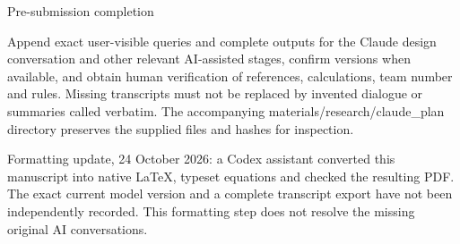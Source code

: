 Pre-submission completion


Append exact user-visible queries and complete outputs for the Claude design conversation and other relevant AI-assisted stages, confirm versions when available, and obtain human verification of references, calculations, team number and rules. Missing transcripts must not be replaced by invented dialogue or summaries called verbatim. The accompanying materials/research/claude\_plan directory preserves the supplied files and hashes for inspection.


Formatting update, 24 October 2026: a Codex assistant converted this manuscript into native LaTeX, typeset equations and checked the resulting PDF. The exact current model version and a complete transcript export have not been independently recorded. This formatting step does not resolve the missing original AI conversations.

